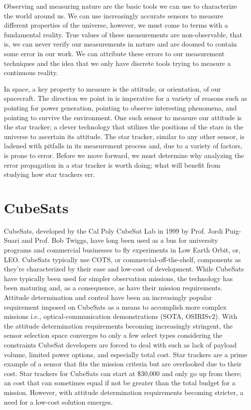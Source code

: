 \par \qquad Observing and measuring nature are the basic tools we can use to characterize the world around us.
We can use increasingly accurate sensors to measure different properties of the universe, however, we must come to terms with a fundamental reality.
True values of these measurements are non-observable, that is, we can never verify our measurements in nature and are doomed to contain some error in our work.
We can attribute these errors to our measurement techniques and the idea that we only have discrete tools trying to measure a continuous reality.

\par \qquad In space, a key property to measure is the attitude, or orientation, of our spacecraft.
The direction we point in is imperative for a variety of reasons such as pointing for power generation, pointing to observe interesting phenomena, and pointing to survive the environment.
One such sensor to measure our attitude is the star tracker; a clever technology that utilizes the positions of the stars in the universe to ascertain its attitude.
The star tracker, similar to any other sensor, is ladened with pitfalls in its measurement process and, due to a variety of factors, is prone to error.
Before we move forward, we must determine why analyzing the error propagation in a star tracker is worth doing; what will benefit from studying how star trackers err.

\section*{CubeSats}
\par \qquad CubeSats, developed by the Cal Poly CubeSat Lab in 1999 by Prof. Jordi Puig-Suari and Prof. Bob Twiggs, have long been used as a bus for university programs and commercial businesses to fly experiments in Low Earth Orbit, or, LEO.
CubeSats typically use COTS, or commercial-off-the-shelf, components as they're characterized by their ease and low-cost of development.
While CubeSats have typically been used for simpler observation missions, the technology has been maturing and, as a consequence, as have their mission requirements.
Attitude determination and control have been an increasingly popular requirement imposed on CubeSats as a means to accomplish more complex missions i.e., optical-communication demonstrations (SOTA, OSIRISv2)\cite{OpticalCommsInSpace}.
With the attitude determination requirements becoming increasingly stringent, the sensor selection space converges to only a few select types considering the constraints CubeSat developers are forced to deal with such as lack of payload volume, limited power options, and especially total cost.
Star trackers are a prime example of a sensor that fits the mission criteria but are overlooked due to their cost.
Star trackers for CubeSats can start at \$30,000 and only go up from there; an cost that can sometimes equal if not be greater than the total budget for a mission.
However, with attitude determination requirements becoming stricter, a need for a low-cost solution emerges.

